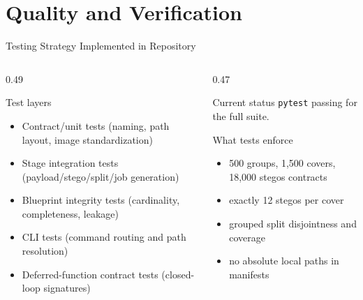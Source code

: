 \documentclass[aspectratio=169,11pt]{beamer}
\begin{document}
\section{Quality and Verification}

\begin{frame}{Testing Strategy Implemented in Repository}
\small
\begin{columns}[T]
\begin{column}{0.49\textwidth}
\begin{block}{Test layers}
\begin{itemize}
\item Contract/unit tests (naming, path layout, image standardization)
\item Stage integration tests (payload/stego/split/job generation)
\item Blueprint integrity tests (cardinality, completeness, leakage)
\item CLI tests (command routing and path resolution)
\item Deferred-function contract tests (closed-loop signatures)
\end{itemize}
\end{block}
\end{column}
\begin{column}{0.47\textwidth}
\begin{alertblock}{Current status}
\small
\texttt{pytest} passing for the full suite.
\end{alertblock}
\begin{exampleblock}{What tests enforce}
\scriptsize
\begin{itemize}
\item 500 groups, 1,500 covers, 18,000 stegos contracts
\item exactly 12 stegos per cover
\item grouped split disjointness and coverage
\item no absolute local paths in manifests
\end{itemize}
\end{exampleblock}
\end{column}
\end{columns}
\end{frame}
\end{document}
